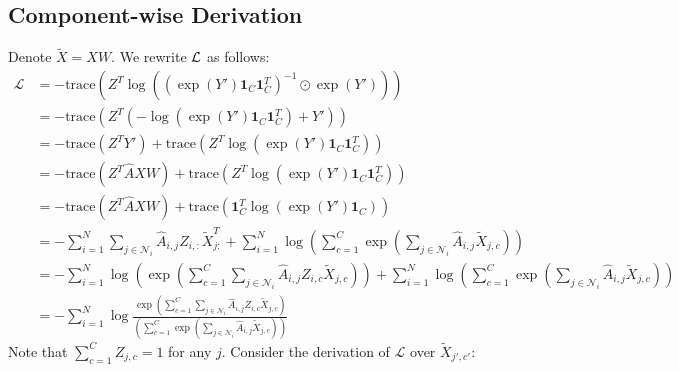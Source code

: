 \documentclass{article}
\newcommand{\trace}{\mathrm{trace}}
\newcommand{\0}{{\boldsymbol{0}}}
\newcommand{\6}{{\partial}}
\newcommand{\8}{{\infty}}
\newcommand{\4}{{\nabla}}
\begin{document}
\subsection{Component-wise Derivation}
Denote $\tilde{X}=XW$. 
We rewrite $\cal L$ as follows:
\begin{align*}
    \label{eq:nll_loss_explanation_details}
    \mathcal{L} & = -\trace\left(Z^T \log \left((\exp({Y'}) \bm{1}_C \bm{1}_C^T )^{-1}  \odot \exp({Y'})\right) \right) \\
    & = -\trace\left(Z^T  \left(-\log(\exp({Y'}) \bm{1}_C \bm{1}_C^T ) + {Y'} \right) \right) \\
    & = -\trace\left(Z^T {Y'} \right) + \trace\left(Z^T  \log\left(\exp({Y'}) \bm{1}_C \bm{1}_C^T \right)  \right)\\
    & = -\trace\left(Z^T \hat{A} X W  \right) + \trace\left(Z^T  \log\left(\exp({Y'}) \bm{1}_C \bm{1}_C^T \right)  \right)\\
    & = -\trace\left(Z^T \hat{A} X W  \right) + \trace\left(\bm{1}_C^T  \log\left(\exp({Y'}) \bm{1}_C \right)  \right)\\
    & = - \sum\limits_{i=1}^N \sum\limits_{j\in \mathcal{N}_i}  \hat{A}_{i,j} Z_{i,:}\tilde{X}_{j:}^T + \sum\limits_{i=1}^N \log \left( \sum\limits_{c=1}^C \exp(\sum\limits_{j\in \mathcal{N}_i} \hat{A}_{i,j} \tilde{X}_{j,c}) \right)\\
    & = - \sum\limits_{i=1}^N \log \left( \exp\left( \sum\limits_{c=1}^C \sum\limits_{j\in \mathcal{N}_i}  \hat{A}_{i,j} Z_{i,c}\tilde{X}_{j,c} \right) \right) + \sum\limits_{i=1}^N \log \left( \sum\limits_{c=1}^C \exp\left(\sum\limits_{j\in \mathcal{N}_i} \hat{A}_{i,j} \tilde{X}_{j,c} \right) \right)\\
    &= - \sum\limits_{i=1}^N \log \frac{\exp \left(\sum\limits_{c=1}^C \sum\limits_{j\in \mathcal{N}_i} \hat{A}_{i,j} Z_{i,c}\tilde{X}_{j,c}\right)}{\left(\sum\limits_{c=1}^C \exp(\sum\limits_{j\in \mathcal{N}_i} \hat{A}_{i,j} \tilde{X}_{j,c}) \right)}
    \end{align*}
Note that $\sum\limits_{c=1}^C Z_{j,c} = 1$ for any $j$. 
Consider the derivation of $\mathcal{L}$ over $\tilde{X}_{j',c'}$:
\end{document}
